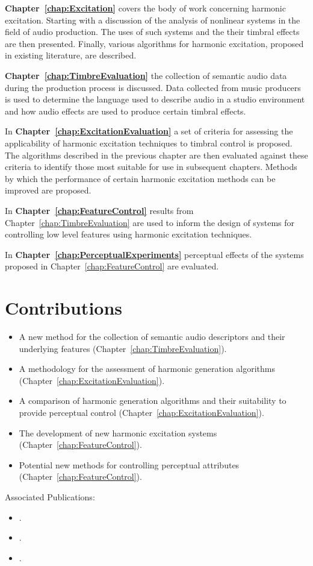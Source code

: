 	{\bf{Chapter~\ref{chap:Excitation}}} covers the body of work concerning harmonic excitation. Starting with a
	discussion of the analysis of nonlinear systems in the field of audio production. The uses of such systems and the
	their timbral effects are then presented. Finally, various algorithms for harmonic excitation, proposed in existing
	literature, are described.

	{\bf{Chapter~\ref{chap:TimbreEvaluation}}} the collection of semantic audio data during the production process is
	discussed. Data collected from music producers is used to determine the language used to describe audio in a studio
	environment and how audio effects are used to produce certain timbral effects.

	In {\bf{Chapter~\ref{chap:ExcitationEvaluation}}} a set of criteria for assessing the applicability of
	harmonic excitation techniques to timbral control is proposed. The algorithms described in the previous chapter are
	then evaluated against these criteria to identify those most suitable for use in subsequent chapters. Methods by
	which the performance of certain harmonic excitation methods can be improved are proposed.

	In {\bf{Chapter~\ref{chap:FeatureControl}}} results from Chapter~\ref{chap:TimbreEvaluation} are used to inform
	the design of systems for controlling low level features using harmonic excitation techniques.

	In {\bf{Chapter~\ref{chap:PerceptualExperiments}}} perceptual effects of the systems proposed in
	Chapter~\ref{chap:FeatureControl} are evaluated. 

\section{Contributions}
\label{sec:Introduction-Contributions}


	\begin{itemize}
		\item A new method for the collection of semantic audio descriptors and their underlying features
		      (Chapter~\ref{chap:TimbreEvaluation}).
		\item A methodology for the assessment of harmonic generation algorithms
		      (Chapter~\ref{chap:ExcitationEvaluation}).
		\item A comparison of harmonic generation algorithms and their suitability to provide perceptual control
		      (Chapter~\ref{chap:ExcitationEvaluation}).
		\item The development of new harmonic excitation systems (Chapter~\ref{chap:FeatureControl}).
		\item Potential new methods for controlling perceptual attributes (Chapter~\ref{chap:FeatureControl}).
	\end{itemize}

	Associated Publications:

	\begin{itemize}
		\item {}.
		\item {}.
		\item {}.
	\end{itemize}

